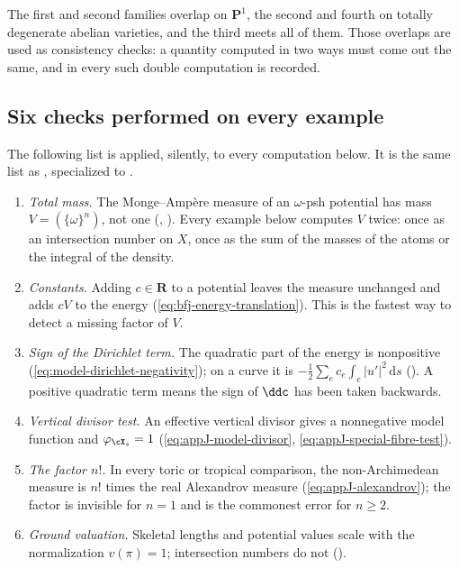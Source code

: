 The first and second families overlap on \(\mathbf P^1\), the second and
fourth on totally degenerate abelian varieties, and the third meets all of
them.  Those overlaps are used as consistency checks: a quantity computed in
two ways must come out the same, and in  every
such double computation is recorded.

\subsection{Six checks performed on every example}
\label{sec:ch31-checks}

The following list is applied, silently, to every computation below.  It is
the same list as , specialized to
.

\begin{enumerate}
\item\label{itm:ch31-check:mass}
 \emph{Total mass.}  The Monge--Amp\`ere measure of an \(\omega\)-psh
 potential has mass \(V=(\{\omega\}^n)\), not one
 (, ).  Every example below
 computes \(V\) twice: once as an intersection number on \(X\), once as the
 sum of the masses of the atoms or the integral of the density.
\item\label{itm:ch31-check:constant}
 \emph{Constants.}  Adding \(c\in\mathbf R\) to a potential leaves the
 measure unchanged and adds \(cV\) to the energy
 (\eqref{eq:bfj-energy-translation}).  This is the fastest way to detect a
 missing factor of \(V\).
\item\label{itm:ch31-check:sign}
 \emph{Sign of the Dirichlet term.}  The quadratic part of the energy is
 nonpositive (\eqref{eq:model-dirichlet-negativity}); on a curve it is
 \(-\tfrac12\sum_e c_e\int_e|u'|^2\,\mathrm ds\) ().  A positive
 quadratic term means the sign of \(\ddc\) has been taken backwards.
\item\label{itm:ch31-check:vertical}
 \emph{Vertical divisor test.}  An effective vertical divisor gives a
 nonnegative model function and \(\varphi_{\cX_s}=1\)
 (\eqref{eq:appJ-model-divisor}, \eqref{eq:appJ-special-fibre-test}).
\item\label{itm:ch31-check:factorial}
 \emph{The factor \(n!\).}  In every toric or tropical comparison, the
 non-Archimedean measure is \(n!\) times the real Alexandrov measure
 (\eqref{eq:appJ-alexandrov}); the factor is invisible for \(n=1\) and is
 the commonest error for \(n\geq2\).
\item\label{itm:ch31-check:normalization}
 \emph{Ground valuation.}  Skeletal lengths and potential values scale with
 the normalization \(v(\pi)=1\); intersection numbers do not
 ().
\end{enumerate}

